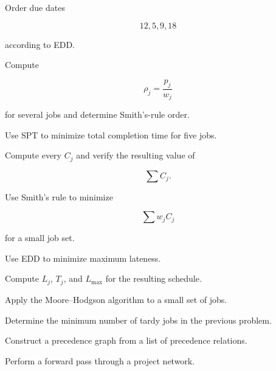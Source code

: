 \begin{exercise}[2]
Order due dates

\[
12,5,9,18
\]

according to EDD.
\end{exercise}

\begin{exercise}[2]
Compute

\[
\rho_j
=
\frac{p_j}{w_j}
\]

for several jobs and determine Smith's-rule order.
\end{exercise}

\begin{exercise}[3]
Use SPT to minimize total completion time for five jobs.
\end{exercise}

\begin{exercise}[3]
Compute every \(C_j\) and verify the resulting value of

\[
\sum C_j.
\]
\end{exercise}

\begin{exercise}[3]
Use Smith's rule to minimize

\[
\sum w_jC_j
\]

for a small job set.
\end{exercise}

\begin{exercise}[3]
Use EDD to minimize maximum lateness.
\end{exercise}

\begin{exercise}[3]
Compute \(L_j\), \(T_j\), and \(L_{\max}\) for the resulting schedule.
\end{exercise}

\begin{exercise}[3]
Apply the Moore--Hodgson algorithm to a small set of jobs.
\end{exercise}

\begin{exercise}[3]
Determine the minimum number of tardy jobs in the previous problem.
\end{exercise}

\begin{exercise}[3]
Construct a precedence graph from a list of precedence relations.
\end{exercise}

\begin{exercise}[3]
Perform a forward pass through a project network.
\end{exercise}

